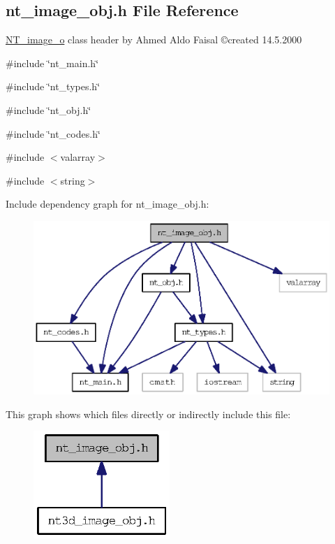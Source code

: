 \subsection{nt\_\-image\_\-obj.h File Reference}
\label{nt__image__obj_8h}



\begin{DoxyItemize}
\item \hyperlink{class_n_t__image__o}{NT\_\-image\_\-o} class header by Ahmed Aldo Faisal \copyright created 14.5.2000 
\end{DoxyItemize} 


{\ttfamily \#include \char`\"{}nt\_\-main.h\char`\"{}}\par
{\ttfamily \#include \char`\"{}nt\_\-types.h\char`\"{}}\par
{\ttfamily \#include \char`\"{}nt\_\-obj.h\char`\"{}}\par
{\ttfamily \#include \char`\"{}nt\_\-codes.h\char`\"{}}\par
{\ttfamily \#include $<$valarray$>$}\par
{\ttfamily \#include $<$string$>$}\par
Include dependency graph for nt\_\-image\_\-obj.h:
\nopagebreak
\begin{figure}[H]
\begin{center}
\leavevmode
\includegraphics[width=382pt]{nt__image__obj_8h__incl}
\end{center}
\end{figure}
This graph shows which files directly or indirectly include this file:
\nopagebreak
\begin{figure}[H]
\begin{center}
\leavevmode
\includegraphics[width=146pt]{nt__image__obj_8h__dep__incl}
\end{center}
\end{figure}
